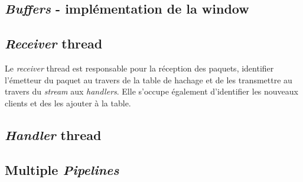 \documentclass[../main.tex]{subfiles}
\begin{document}
\subsection{\textit{Buffers} - implémentation de la window}
\label{sec:buffer}

\subsection{\textit{Receiver} thread}
\label{sec:receiver}

Le \textit{receiver} thread est responsable pour la réception des paquets, identifier l'émetteur du paquet au travers de la table de hachage
et de les transmettre au travers du \textit{stream} aux \textit{handlers}. Elle s'occupe également d'identifier les nouveaux clients et 
des les ajouter à la table. 

\subsection{\textit{Handler} thread}
\label{sec:handler}

\subsection{Multiple \textit{Pipelines}}
\label{sec:pipelines}
\end{document}
